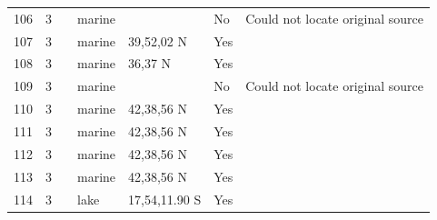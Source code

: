 \documentclass[12pt]{article}
\begin{document}
\begin{landscape}
\begin{table}[h!]
{\begin{tabular}{p{2.8cm}p{1.3cm}p{5.5cm}p{2.2cm}p{2.5cm}lp{3.5cm}}
        106   & 3 & \citet{Glynn1965}  & marine &       & No    & Could not locate original source \\
        107   & 3 & \citet{Peterson1979}  & marine & 39,52,02 N & Yes   &       \\
        108   & 3 & \citet{Hewatt1937}  & marine & 36,37 N & Yes   &       \\
        109   & 3 & \citet{Castilla1981} & marine &       & No    & Could not locate original source \\
        110   & 3 & \citet{Dexter1947}  & marine & 42,38,56 N & Yes   &       \\
        111   & 3 & \citet{Dexter1947}  & marine & 42,38,56 N & Yes   &       \\
        112   & 3 & \citet{Dexter1947}  & marine & 42,38,56 N & Yes   &       \\
        113   & 3 & \citet{Dexter1947}  & marine & 42,38,56 N & Yes   &       \\
        114   & 3 & \citet{Marshall1982}  & lake  & 17,54,11.90 S & Yes   &       \\
        \hline
      \end{tabular}}%
      \end{table}

        \newpage



\end{landscape}
\end{document}
